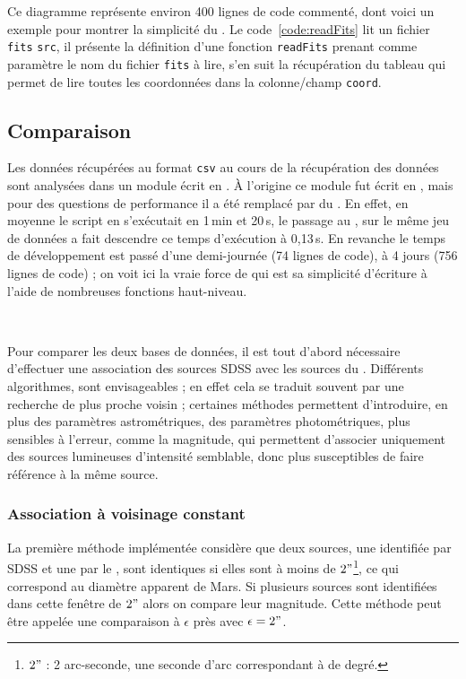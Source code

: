 Ce diagramme représente environ 400 lignes de code commenté, dont voici un exemple pour montrer la simplicité du \Python. Le code~\ref{code:readFits} lit un fichier \texttt{fits} \texttt{src}, il présente la définition d'une fonction \texttt{readFits} prenant comme paramètre le nom du fichier \texttt{fits} à lire, s'en suit la récupération du tableau qui permet de lire toutes les coordonnées dans la colonne/champ \texttt{coord}.

	

	\subsection{Comparaison}

Les données récupérées au format \texttt{csv} au cours de la récupération des données sont analysées dans un module écrit en \Cpp{}. À l'origine ce module fut écrit en \Python, mais pour des questions de performance il a été remplacé par du \Cpp{}. En effet, en moyenne le script en \Python{} s'exécutait en 1\,min et 20\,s, le passage au \Cpp{}, sur le même jeu de données a fait descendre ce temps d'exécution à 0,13\,s. En revanche le temps de développement est passé d'une demi-journée (74 lignes de code), à 4 jours (756 lignes de code) ; on voit ici la vraie force de \Python{} qui est sa simplicité d'écriture à l'aide de nombreuses fonctions haut-niveau.

\

Pour comparer les deux bases de données, il est tout d'abord nécessaire d'effectuer une association des sources SDSS avec les sources du \stack. Différents algorithmes, sont envisageables ; en effet cela se traduit souvent par une recherche de plus proche voisin ; certaines méthodes permettent d'introduire, en plus des paramètres astrométriques, des paramètres photométriques, plus sensibles à l'erreur, comme la magnitude, qui permettent d'associer uniquement des sources lumineuses d'intensité semblable, donc plus susceptibles de faire référence à la même source.

		\subsubsection{Association à voisinage constant}

La première méthode implémentée considère que deux sources, une identifiée par SDSS et une par le \stack, sont identiques si elles sont à moins de $2"$\footnote{$2"$ : 2 arc-seconde, une seconde d'arc correspondant à  de degré.}, ce qui correspond au diamètre apparent de Mars. Si plusieurs sources sont identifiées dans cette fenêtre de $2"$ alors on compare leur magnitude. Cette méthode peut être appelée une comparaison à $\epsilon$ près avec $\epsilon = 2"$.


